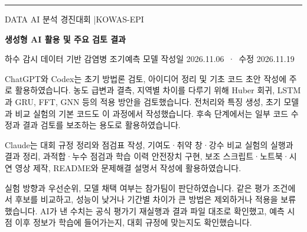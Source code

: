 \documentclass[10pt]{article}
\newcommand{\hy}{{\hyfont -}}
\newcommand{\sect}[1]{\par\vspace{8pt}{\fontsize{12.6}{15}\selectfont\bfseries #1\par}\nointerlineskip\vspace{4pt}\noindent{\color[gray]{0.2}\rule{\textwidth}{0.4pt}}\par\nointerlineskip\vspace{4pt}}
\begin{document}
\fontsize{9.5}{12.5}\selectfont
\rule{\textwidth}{0.4pt}\par\vspace{1pt}
{\fontsize{8.3}{10} DATA AI 분석 경진대회 \quad|\quad KOWAS\hy{}EPI}\par\vspace{2pt}
{\fontsize{17.4}{21}\selectfont\bfseries 생성형 AI 활용 및 주요 검토 결과}\par\vspace{1pt}
{\fontsize{8.7}{11}\selectfont 하수 감시 데이터 기반 감염병 조기예측 모델 \hfill 작성일 2026.11.06 \,·\, 수정 2026.11.19}\par

\sect{1. AI 활용 범위}
ChatGPT와 Codex는 초기 방법론 검토, 아이디어 정리 및 기초 코드 초안 작성에 주로 활용하였습니다. 농도 급변과 결측, 지역별 차이를 다루기 위해 Huber 회귀, LSTM과 GRU, FFT, GNN 등의 적용 방안을 검토했습니다. 전처리와 특징 생성, 초기 모델과 비교 실험의 기본 코드도 이 과정에서 작성했습니다. 후속 단계에서는 일부 코드 수정과 결과 검토를 보조하는 용도로 활용하였습니다.

\vspace{3pt}
Claude는 대회 규정 정리와 점검표 작성, 기여도·취약 창·강수 비교 실험의 실행과 결과 정리, 과적합·누수 점검과 학습 이력 안전장치 구현, 보조 스크립트·노트북·시연 영상 제작, README와 문제해결 설명서 작성에 활용하였습니다.

\vspace{3pt}
실험 방향과 우선순위, 모델 채택 여부는 참가팀이 판단하였습니다. 같은 평가 조건에서 후보를 비교하고, 성능이 낮거나 기간별 차이가 큰 방법은 제외하거나 적용을 보류했습니다. AI가 낸 수치는 공식 평가기 재실행과 결과 파일 대조로 확인했고, 예측 시점 이후 정보가 학습에 들어가는지, 대회 규정에 맞는지도 확인했습니다.
\end{document}
